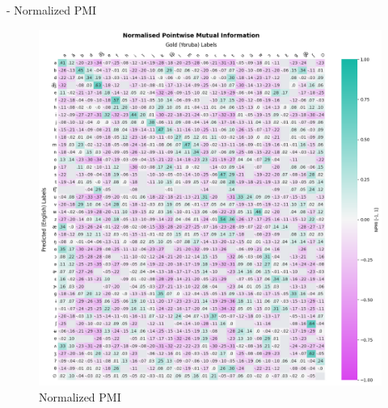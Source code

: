 \documentclass[11pt]{article}
\begin{document}
{- Normalized PMI
\begin{figure}
    \centering
    \includegraphics[width=1\linewidth]{NormalisedPMI.png}
    \caption{Normalized PMI}
    \label{fig:placeholder}
\end{figure}

}
\end{document}
